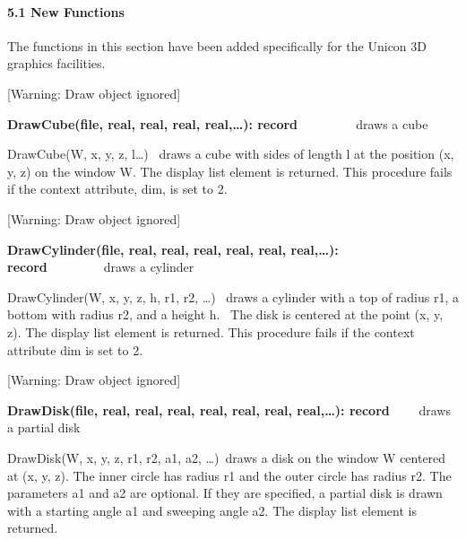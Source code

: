 \documentclass[letterpaper]{article}
\begin{document}
\bigskip


\bigskip

\paragraph[5.1 New Functions]{\bfseries 5.1 New Functions}

\bigskip

{
The functions in this section have been added specifically for the Unicon 3D graphics facilities.}

[Warning: Draw object ignored]

{
\textsf{\textbf{DrawCube(file, real, real, real, real,{\dots}): record}}\textbf{\ \ }\ \ \ \ \ \  \ draws a cube}


\bigskip

{
\textsf{DrawCube(W, x, y, z, l{\dots}) \ }draws a cube with sides of length l at the position (x, y, z) on the window W.
The display list element is returned. This procedure fails if the context attribute, dim, is set to 2. }


\bigskip

[Warning: Draw object ignored]

{
\textsf{\textbf{DrawCylinder(file, real, real, real, real, real, real,{\dots}): record}}\ \  \ \ \ \ \ \ \ draws a
cylinder}


\bigskip

{
\textsf{DrawCylinder(W, x, y, z, h, r1, r2, {\dots})} \ draws a cylinder with a top of radius r1, a bottom with radius
r2, and a height h. \ The disk is centered at the point (x, y, z). The display list element is returned. This procedure
fails if the context attribute dim is set to 2.}

[Warning: Draw object ignored]

{
\textsf{\textbf{DrawDisk(file, real, real, real, real, real, real, real,{\dots}): record}}\textbf{ }\ \  \ \ draws a
partial disk}


\bigskip

{
\textsf{DrawDisk(W, x, y, z, r1, r2, a1, a2, {\dots})}\texttt{ }draws a disk on the window W centered at (x, y, z). The
inner circle has radius r1 and the outer circle has radius r2. The parameters a1 and a2 are optional. If they are
specified, a partial disk is drawn with a starting angle a1 and sweeping angle a2. The display list element is
returned.}
\end{document}
